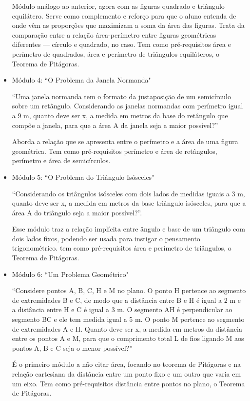 \begin{itemize}
    Módulo análogo ao anterior, agora com as figuras quadrado e triângulo equilátero. Serve como complemento e reforço para que o aluno entenda de onde vêm as proporções que maximizam a soma da área das figuras. Trata da comparação entre a relação área-perímetro entre figuras geométricas diferentes --- círculo e quadrado, no caso. Tem como pré-requisitos área e perímetro de quadrados, área e perímetro de triângulos equiláteros, o Teorema de Pitágoras. 
    
    \item Módulo 4: ``O Problema da Janela Normanda"
    
    ``Uma janela normanda tem o formato da justaposição de um semicírculo sobre um retângulo. Considerando as janelas normandas com perímetro igual a 9 m, quanto deve ser x, a medida em metros da base do retângulo que compõe a janela, para que a área A da janela seja a maior possível?”
    
    Aborda a relação que se apresenta entre o perímetro e a área de uma figura geométrica. Tem como pré-requisitos perímetro e área de retângulos, perímetro e área de semicírculos.
    
    \item Módulo 5: ``O Problema do Triângulo Isósceles"
    
    ``Considerando os triângulos isósceles com dois lados de medidas iguais a 3 m, quanto deve ser x, a medida em metros da base triângulo isósceles, para que a área A do triângulo seja a maior possível?”.
    
    Esse módulo traz a relação implícita entre ângulo e base de um triângulo com dois lados fixos, podendo ser usada para instigar o pensamento trigonométrico. tem como pré-requisitos área e perímetro de triângulos, o Teorema de Pitágoras.
    
    \item Módulo 6: ``Um Problema Geométrico"
    
     ``Considere pontos A, B, C, H e M no plano. O ponto H pertence ao segmento de extremidades B e C, de modo que a distância entre B e H é igual a 2 m e a distância entre H e C é igual a 3 m. O segmento AH é perpendicular ao segmento BC e ele tem medida igual a 5 m. O ponto M pertence ao segmento de extremidades A e H. Quanto deve ser x, a medida em metros da distância entre os pontos A e M, para que o comprimento total L de fios ligando M aos pontos A, B e C seja o menor possível?”
     
     É o primeiro módulo a não citar área, focando no teorema de Pitágoras e na relação cartesiana da distância entre um ponto fixo e um outro que varia em um eixo. Tem como pré-requisitos distância entre pontos no plano, o Teorema de Pitágoras.
    

\end{itemize}
